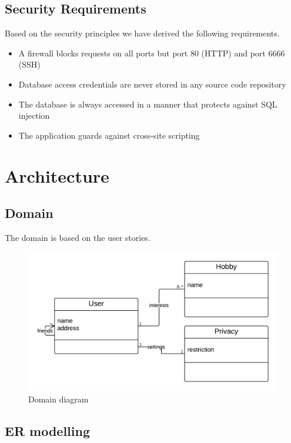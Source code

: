 \documentclass[a4paper]{article}
\begin{document}
\subsection{Security Requirements}
Based on the security principles we have derived the following requirements.
\begin{itemize}
\item A firewall blocks requests on all ports but port 80 (HTTP) and port 6666 (SSH)
\item Database access credentials are never stored in any source code repository
\item The database is always accessed in a manner that protects against SQL injection
\item The application guards against cross-site scripting
\end{itemize}

\section{Architecture}

\subsection{Domain}
The domain is based on the user stories.

\begin{figure}[h!]
\centering
\includegraphics[scale=0.3]{Domain}
\caption{Domain diagram}
\label{fig:domain_diagram}
\end{figure}

\subsection{ER modelling}
\end{document}
